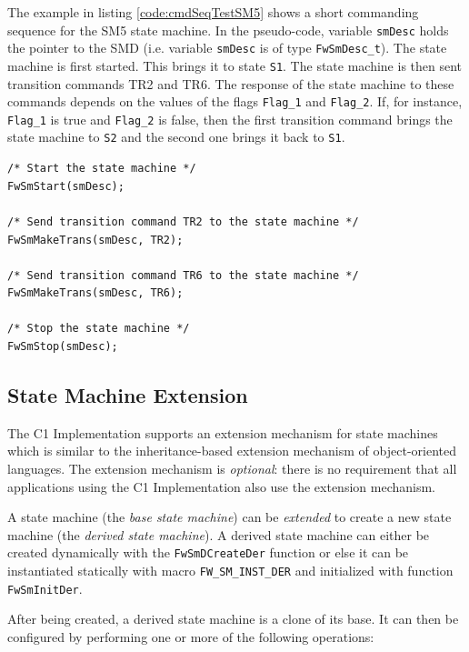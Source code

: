 \documentclass[manual]{../fwprofile}
\begin{document}
The example in listing \ref{code:cmdSeqTestSM5} shows a short commanding sequence for the SM5 state machine. 
In the pseudo-code, variable 
\texttt{smDesc} holds the pointer to the SMD (i.e. variable \texttt{smDesc} is of type \texttt{FwSmDesc\_t}). 
The state machine is first started. This brings it to state \texttt{S1}. The state machine is then sent transition 
commands TR2 and TR6. The response of the state machine to these commands depends on the values of the flags 
\texttt{Flag\_1} and \texttt{Flag\_2}. If, for instance, \texttt{Flag\_1} is true and \texttt{Flag\_2} is false, 
then the first transition command brings the state machine to \texttt{S2} and the second one brings it back to \texttt{S1}.

\begin{lstlisting}
/* Start the state machine */
FwSmStart(smDesc);

/* Send transition command TR2 to the state machine */
FwSmMakeTrans(smDesc, TR2);

/* Send transition command TR6 to the state machine */
FwSmMakeTrans(smDesc, TR6);

/* Stop the state machine */
FwSmStop(smDesc);
\end{lstlisting}

\subsection{State Machine Extension}
The C1 Implementation supports an extension mechanism for state machines which is similar to the inheritance-based 
extension mechanism of object-oriented languages. The extension mechanism is \emph{optional}: there is no requirement 
that all applications using the C1 Implementation also use the extension mechanism.



A state machine (the \emph{base state machine}) can be \emph{extended} to create a new state machine 
(the \emph{derived state machine}). A derived state machine can either be created dynamically with the 
\texttt{FwSmDCreateDer} function or else it can be instantiated statically with macro \texttt{FW\_SM\_INST\_DER} and 
initialized with function \texttt{FwSmInitDer}.



After being created, a derived state machine is a clone of its base. It can then be configured by performing 
one or more of the following operations: 
\end{document}

